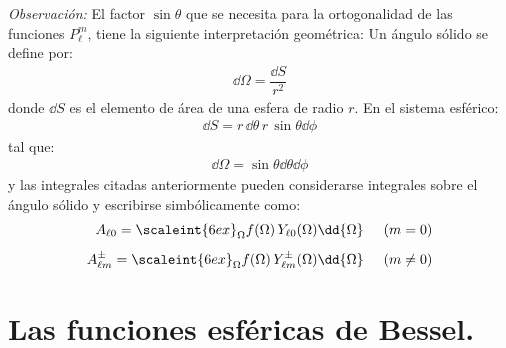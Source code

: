 \emph{Observación: } El factor $\sin \theta$ que se necesita para la ortogonalidad de las funciones $P_{\ell}^{m}$, tiene la siguiente interpretación geométrica: Un ángulo sólido se define por:
\begin{align*}
\dd{\Omega} = \dfrac{\dd{S}}{r^{2}}
\end{align*}
donde $\dd{S}$ es el elemento de área de una esfera de radio $r$. En el sistema esférico:
\begin{align*}
\dd{S} = r \, \dd{\theta} \, r \, \sin \theta \dd{\phi}
\end{align*}
tal que:
\begin{align*}
\dd{\Omega} = \sin \theta \dd{\theta} \dd{\phi}
\end{align*}
y las integrales citadas anteriormente pueden considerarse integrales sobre el ángulo sólido y escribirse simbólicamente como:
\begin{align*}
A_{\ell 0} = \scaleint{6ex}_{\Omega} f (\Omega) \, Y_{\ell 0} (\Omega) \dd{\Omega} \hspace{0.5cm} (m = 0) \\[0.5em]
A_{\ell m}^{\pm} = \scaleint{6ex}_{\Omega} f (\Omega) \, Y_{\ell m}^{\pm} (\Omega) \dd{\Omega} \hspace{0.5cm} (m \neq 0)
\end{align*}

\section{Las funciones esféricas de Bessel.}

